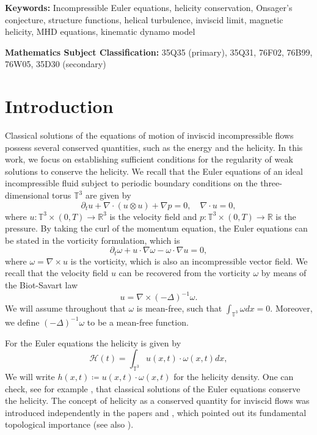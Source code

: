 \documentclass[12pt,a4paper]{article}
\theoremstyle{definition}
\theoremstyle{remark}
\numberwithin{equation}{section}
\begin{document}
\noindent \textbf{Keywords:} Incompressible Euler equations, helicity conservation, Onsager's conjecture, structure functions, helical turbulence, inviscid limit, magnetic helicity, MHD equations, kinematic dynamo model 

\vspace{0.1cm} \noindent \textbf{Mathematics Subject Classification:} 35Q35 (primary), 35Q31, 76F02, 76B99, 76W05, 35D30 (secondary)

\section{Introduction}
Classical solutions of the equations of motion of inviscid incompressible flows possess several conserved quantities, such as the energy and the helicity. In this work, we focus on establishing sufficient conditions for the regularity of weak solutions to conserve the helicity. We recall that the Euler equations of an ideal incompressible fluid subject to periodic boundary conditions on the three-dimensional torus $\mathbb{T}^3$ are given by
\begin{equation} \label{eulerequation}
\partial_t u + \nabla \cdot (u \otimes u) + \nabla p = 0, \quad \nabla \cdot u = 0,
\end{equation}
where $u : \mathbb{T}^3 \times (0,T) \rightarrow \mathbb{R}^3$ is the velocity field and $p : \mathbb{T}^3 \times (0,T) \rightarrow \mathbb{R}$ is the pressure. By taking the curl of the momentum equation, the Euler equations can be stated in the vorticity formulation, which is
\begin{equation} \label{vorticityequation}
\partial_t \omega + u \cdot \nabla \omega - \omega \cdot \nabla u = 0, 
\end{equation} 
where $\omega = \nabla \times u$ is the vorticity, which is also an incompressible vector field. We recall that the velocity field $u$ can be recovered from the vorticity $\omega$ by means of the Biot-Savart law
\begin{equation}
u = \nabla \times (-\Delta)^{-1} \omega.
\end{equation}
We will assume throughout that $\omega$ is mean-free, such that $\int_{\mathbb{T}^3} \omega dx = 0$. Moreover, we define $(-\Delta)^{-1} \omega$ to be a mean-free function.

For the Euler equations the helicity is given by
\begin{equation}
\mathcal{H} (t) = \int_{\mathbb{T}^3} u (x,t) \cdot \omega (x,t) dx,
\end{equation}
We will write $h(x,t) \coloneqq u(x,t) \cdot \omega(x,t)$ for the helicity density. 
One can check, see for example \cite[~Section 2.1]{derosa}, that classical solutions of the Euler equations conserve the helicity. The concept of helicity as a conserved quantity for inviscid flows was introduced independently in the papers \cite{moffatt} and \cite{moreau}, which pointed out its fundamental topological importance (see also \cite{moffattreview}). 
\end{document}
